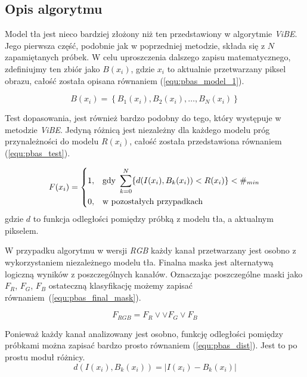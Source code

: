 \subsection{Opis algorytmu}
\label{subsec:pbas_opis}

Model tła jest nieco bardziej złożony niż ten przedstawiony w algorytmie \textit{ViBE}. 
Jego pierwsza część, podobnie jak w poprzedniej metodzie, składa się z $N$ zapamiętanych próbek. 
W celu uproszczenia dalszego zapisu matematycznego, zdefiniujmy ten zbiór jako $B(x_i)$, gdzie $x_i$ to aktualnie przetwarzany piksel obrazu, całość została opisana równaniem (\ref{equ:pbas_model_1}).

	\begin{equation}
		B(x_i)= \left\{ B_1(x_i), B_2(x_i), \dotsc, B_N(x_i) \right\}
	\label{equ:pbas_model_1}	
	\end{equation}

Test dopasowania, jest również bardzo podobny do tego, który występuje w metodzie \textit{ViBE}. 
Jedyną różnicą jest niezależny dla każdego modelu próg przynależności do modelu $R(x_i)$, całość została przedstawiona równaniem (\ref{equ:pbas_test}).

	\begin{equation}
	    F(x_i) = 
		\begin{dcases}
    		1, & \text{gdy } \sum_{k=0}^{N} \{ d(I(x_i), B_k(x_i)) < R(x_i) \} < \#_{min} \\
    		0, & \text{w pozostałych przypadkach} 
		\end{dcases}
	\label{equ:pbas_test}	
	\end{equation}
\noindent gdzie $d$ to funkcja odległości pomiędzy próbką z modelu tła, a aktualnym pikselem. 

W przypadku algorytmu w wersji \textit{RGB} każdy kanał przetwarzany jest osobno z wykorzystaniem niezależnego modelu tła. 
Finalna maska jest alternatywą logiczną wyników z poszczególnych kanałów. 
Oznaczając poszczególne maski jako $F_R$, $F_G$, $F_B$ ostateczną klasyfikację możemy zapisać równaniem~(\ref{equ:pbas_final_mask}).

    \begin{equation}
        F_{RGB} = F_R \lor \lor F_G \lor F_B
    \label{equ:pbas_final_mask}
    \end{equation}


Ponieważ każdy kanał analizowany jest osobno, funkcję odległości pomiędzy próbkami można zapisać bardzo prosto równaniem (\ref{equ:pbas_dist}). Jest to po prostu moduł różnicy.
	\begin{equation}
		d(I(x_i),B_k(x_i)) = | I(x_i) - B_k(x_i) |
	\label{equ:pbas_dist}	
	\end{equation}

